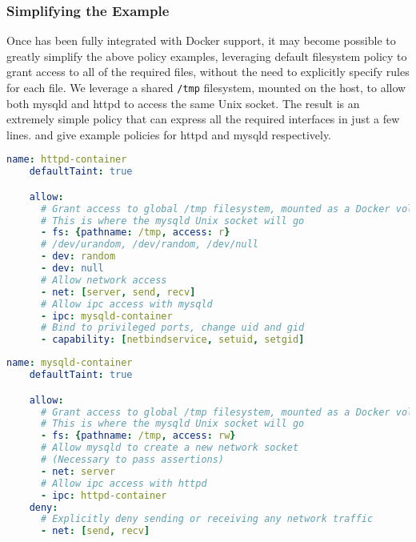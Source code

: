 \subsubsection{Simplifying the \bpfcontain{} Example}

Once \bpfcontain{} has been fully integrated with Docker support, it may become possible
to greatly simplify the above policy examples, leveraging default filesystem policy to
grant access to all of the required files, without the need to explicitly specify rules
for each file. We leverage a shared \texttt{/tmp} filesystem, mounted on the host, to
allow both mysqld and httpd to access the same Unix socket. The result is an extremely
simple policy that can express all the required interfaces in just a few lines.
 and  give example
policies for httpd and mysqld respectively.

\begin{lstlisting}[language=yaml, gobble=4, float=false, caption={[A simplified \bpfcontain{} policy for Apache httpd]
  A simplified \bpfcontain{} policy for Apache httpd running in a Docker container,
  leveraging future support for automatic filesystem policy.
  %\todo{Describe this}
}, label={lst:bpfcontain-httpd-next}]
    name: httpd-container
    defaultTaint: true

    allow:
      # Grant access to global /tmp filesystem, mounted as a Docker volume
      # This is where the mysqld Unix socket will go
      - fs: {pathname: /tmp, access: r}
      # /dev/urandom, /dev/random, /dev/null
      - dev: random
      - dev: null
      # Allow network access
      - net: [server, send, recv]
      # Allow ipc access with mysqld
      - ipc: mysqld-container
      # Bind to privileged ports, change uid and gid
      - capability: [netbindservice, setuid, setgid]
\end{lstlisting}

\begin{lstlisting}[language=yaml, gobble=4, float=false, caption={[A simplified \bpfcontain{} policy for MySQL]
  A simplified \bpfcontain{} policy for MySQL running in a Docker container, leveraging
  future support for automatic filesystem policy.
  %\todo{Describe this}
}, label={lst:bpfcontain-mysqld-next}]
    name: mysqld-container
    defaultTaint: true

    allow:
      # Grant access to global /tmp filesystem, mounted as a Docker volume
      # This is where the mysqld Unix socket will go
      - fs: {pathname: /tmp, access: rw}
      # Allow mysqld to create a new network socket
      # (Necessary to pass assertions)
      - net: server
      # Allow ipc access with httpd
      - ipc: httpd-container
    deny:
      # Explicitly deny sending or receiving any network traffic
      - net: [send, recv]
\end{lstlisting}


